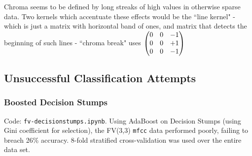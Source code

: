 \documentclass{article}
\begin{document}
\begin{figure}[H]
\begin{minipage}[b]{0.3\textwidth}
    \end{minipage}
    
    \label{fig:chromakernels}
\end{figure}

    Chroma seems to be defined by long streaks of high values in otherwise sparse data. Two kernels which accentuate these effects would be the ``line kernel" - which is just a matrix with horizontal band of ones, and matrix that detects the beginning of such lines - ``chroma break" uses $\begin{pmatrix} 0&0&-1\\0&0&+1\\0&0&-1 \end{pmatrix}$

\subsection{Unsuccessful Classification Attempts}

\subsubsection{Boosted Decision Stumps}\label{boostedstumps}

Code: \texttt{fv-decisionstumps.ipynb}. Using AdaBoost on Decision Stumps (using Gini coefficient for selection), the FV(3,3) \texttt{mfcc} data performed poorly, failing to breach 26\% accuracy. 8-fold stratified cross-validation was used over the entire data set.
\end{document}
